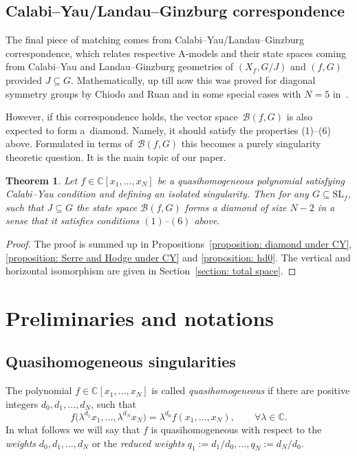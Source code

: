 \documentclass[pdftex]{sigma}
\numberwithin{equation}{section}
\newtheorem{Theorem}{Theorem}[section]
\newcommand{\CC}{{\mathbb{C}}}
\newcommand{\SL}{{\mathrm{SL}}}
\def\B{{\mathcal B}}
\begin{document}
\subsection{Calabi--Yau/Landau--Ginzburg correspondence} The final piece of matching comes from Calabi--Yau/Landau--Ginzburg correspondence, which relates respective A-models and their state spaces coming from Calabi--Yau and Landau--Ginzburg geometries of $(X_f,G/J)$ and $(f,G)$ provided $J\subseteq G$.
Mathematically, up till now this was proved for diagonal symmetry groups by Chiodo and Ruan \cite[Theorem 14]{CR11} and in some special cases with $N=5$ in~\cite{Muk}.

However, if this correspondence holds, the vector space~$\B(f,G)$ is also expected to form a~diamond. Namely, it should satisfy the properties (1)--(6) above. Formulated in terms of~$\B(f,G)$ this becomes a purely singularity theoretic question.
It is the main topic of our paper.

\begin{Theorem}\label{theorem: main}
	Let $f \in \CC[x_1,\dots,x_N]$ be a quasihomogeneous polynomial satisfying Calabi--Yau condition and defining an isolated singularity.
	Then for any $G \subseteq \SL_f$, such that $J \subseteq G$ the state space $\B(f,G)$ forms a diamond of size $N-2$ in a sense that it satisfies conditions $(1)$--$(6)$ above.
\end{Theorem}
\begin{proof}
	The proof is summed up in Propositions~\ref{proposition: diamond under CY}, \ref{proposition: Serre and Hodge under CY} and \ref{proposition: hd0}.
	The vertical and horizontal isomorphism are given in Section~\ref{section: total space}.
\end{proof}

\section{Preliminaries and notations}

\subsection{Quasihomogeneous singularities}

The polynomial $f \in \CC[x_1,\dots,x_N]$ is called \textit{quasihomogeneous} if there are positive integers $d_0,d_1,\dots,d_N$, such that
\begin{equation}\label{QH1}
	f\bigl(\lambda^{d_1}x_1,\dots,\lambda^{d_N}x_N\bigr) = \lambda^{d_0} f(x_1,\dots,x_N), \qquad \forall \lambda \in \CC.
\end{equation}
In what follows we will say that $f$ is quasihomogeneous with respect to the \textit{weights} $d_0,d_1,\dots,d_N$ or the \textit{reduced weights} $q_1 := d_1/d_0,\dots,q_N:= d_N/d_0$.
\end{document}
